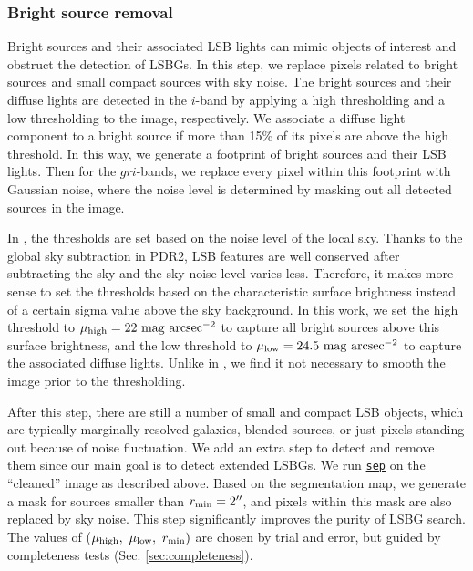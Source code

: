 \documentclass[twocolumn,astrosymb,twocolappendix]{aastex631}
\newcommand{\sbunit}{\mathrm{mag\ arcsec}^{-2}}
\newcommand{\code}[1]{\texttt{#1}}
\begin{document}
\begin{CJK*}{UTF8}{gbsn}
\subsubsection{Bright source removal}
Bright sources and their associated LSB lights can mimic objects of interest and obstruct the detection of LSBGs. In this step, we replace pixels related to bright sources and small compact sources with sky noise. The bright sources and their diffuse lights are detected in the $i$-band by applying a high thresholding and a low thresholding to the image, respectively. We associate a diffuse light component to a bright source if more than 15\% of its pixels are above the high threshold. In this way, we generate a footprint of bright sources and their LSB lights. Then for the $gri$-bands, we replace every pixel within this footprint with Gaussian noise, where the noise level is determined by masking out all detected sources in the image. 
    
    In , the thresholds are set based on the noise level of the local sky. Thanks to the global sky subtraction in PDR2, LSB features are well conserved after subtracting the sky and the sky noise level varies less. Therefore, it makes more sense to set the thresholds based on the characteristic surface brightness instead of a certain sigma value above the sky background. In this work, we set the high threshold to $\mu_{\rm high} = 22\ \sbunit$ to capture all bright sources above this surface brightness, and the low threshold to $\mu_{\rm low} = 24.5\ \sbunit$ to capture the associated diffuse lights. Unlike in , we find it not necessary to smooth the image prior to the thresholding. 
    
    After this step, there are still a number of small and compact LSB objects, which are typically marginally resolved galaxies, blended sources, or just pixels standing out because of noise fluctuation. We add an extra step to detect and remove them since our main goal is to detect extended LSBGs. We run \href{https://sep.readthedocs.io/en/v1.1.x}{\code{sep}} \citep{Barbary2016} on the ``cleaned'' image as described above. Based on the segmentation map, we generate a mask for sources smaller than $r_{\rm min} = 2\mbox{$^{\prime\prime}$}$, and pixels within this mask are also replaced by sky noise. This step significantly improves the purity of LSBG search. The values of ($\mu_{\rm high},\ \mu_{\rm low},\ r_{\rm min})$ are chosen by trial and error, but guided by completeness tests (Sec. \ref{sec:completeness}). 
    

\end{CJK*}
\end{document}
